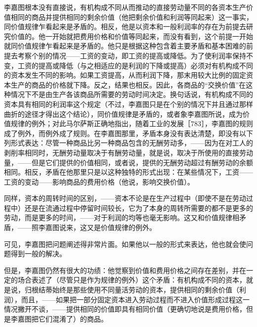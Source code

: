 李嘉图根本没有直接说，有机构成不同从而推动的直接劳动量不同的各资本生产价值相同的商品并提供相同的剩余价值（他把剩余价值和利润等同起来）这一事实，同价值规律乍看起来是矛盾的。相反，他是以资本和一般利润率的存在为前提去研究价值的。他一开始就把费用价格和价值等同起来，而没有看到，这个前提一开始就同价值规律乍看起来是矛盾的。他只是根据这种包含着主要矛盾和基本困难的前提去考察个别的情况——工资的变动，即工资的提高或降低。为了使利润率保持不变，工资的提高或降低（与之相适应的是利润的下降或提高）必须对有机构成不同的资本发生不同的影响。如果工资提高，从而利润下降，那末用较大比例的固定资本生产的商品的价格就下降。反之，结果也相反。因此，各商品的“交换价值”在这种情况下不是由生产各该商品所需要的劳动时间决定。换句话说，有机构成不同的资本具有相同的利润率这个规定（不过，李嘉图只是在个别的情况下并且通过那样曲折的途径才得出这个结论），同价值规律是矛盾的，或者象李嘉图所说，成为价值规律的例外；对此马尔萨斯正确地指出，随着工业的发展［783］，李嘉图的规则成了例外，而例外成了规则。在李嘉图那里，矛盾本身没有表达清楚，即没有以下列形式表达：尽管一种商品比另一种商品包含的无酬劳动多，——因为在对工人的剥削率相同时，无酬劳动量取决于有酬劳动量，就是说，取决于所使用的直接劳动量，——但是它们提供的价值相同，或者说，提供的无酬劳动超过有酬劳动的余额相同。相反，矛盾在他那里只是以这种独特的形式出现：在某些情况下，工资——工资的变动——影响商品的费用价格（他说，影响交换价值）。

同样，资本的周转时间的区别，——资本不论是在生产过程中（即使不是在劳动过程中）还是在流通过程中停留时间较长，它为了本身的周转所需要的都不是更多的劳动，而是更多的时间，——对于利润的均等也毫无影响。这又和价值规律相矛盾，——照李嘉图说来，这又是价值规律的例外。

可见，李嘉图把问题阐述得非常片面。如果他以一般的形式来表达，他也就会使问题得到一般的解决。

但是，李嘉图仍然有很大的功绩：他觉察到价值和费用价格之间存在差别，并在一定的场合表述了（尽管只是作为规律的例外）这个矛盾：有机构成不同的资本，就是说，归根结蒂始终是那些使用不同量活劳动的资本，提供相同的剩余价值（利润），而且，——如果把一部分固定资本进入劳动过程而不进入价值形成过程这一情况撇开不谈，——提供相同的价值即具有相同价值（更确切地说是费用价格，但是李嘉图把它们混淆了）的商品。

